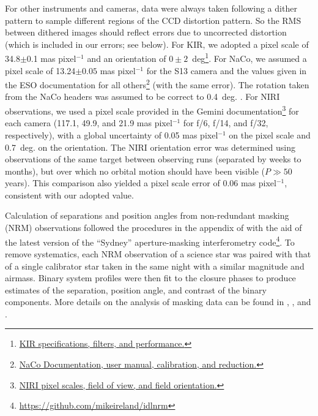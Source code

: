\documentclass[twocolumn]{aastex62}
\begin{document}
For other instruments and cameras, data were always taken following a dither pattern to sample different regions of the CCD distortion pattern. So the RMS between dithered images should reflect errors due to uncorrected distortion (which is included in our errors; see below). For KIR, we adopted a pixel scale of 34.8$\pm$0.1 mas pixel$^{-1}$ \citep{2003ApJ...589..410S} and an orientation of $0\pm2$~deg\footnote{\href{http://www.cfht.hawaii.edu/Instruments/Detectors/IR/KIR/}{KIR specifications, filters, and performance.}}. For NaCo, we assumed a pixel scale of 13.24$\pm0.05$ mas pixel$^{-1}$ for the S13 camera \citep{2003A&A...411..157M,2005A&A...435L..13N} and the values given in the ESO documentation for all others\footnote{\href{http://www.eso.org/sci/facilities/paranal/instruments/naco/doc.html}{NaCo Documentation, user manual, calibration, and reduction.}} (with the same error). The rotation taken from the NaCo headers was assumed to be correct to 0.4~deg. \citep{Sef2008}. For NIRI observations, we used a pixel scale provided in the Gemini documentation\footnote{\href{http://www.gemini.edu/sciops/instruments/niri/imaging/pixel-scales-fov-and-field-orientation}{NIRI pixel scales, field of view, and field orientation.}} for each camera (117.1, 49.9, and 21.9 mas pixel$^{-1}$ for f/6, f/14, and f/32, respectively), with a global uncertainty of 0.05 mas pixel$^{-1}$ on the pixel scale and 0.7~deg. on the orientation. The NIRI orientation error was determined using observations of the same target between observing runs (separated by weeks to months), but over which no orbital motion should have been visible ($P\gg50$ years). This comparison also yielded a pixel scale error of 0.06 mas pixel$^{-1}$, consistent with our adopted value.

Calculation of separations and position angles from non-redundant masking (NRM) observations followed the procedures in the appendix of \citet{Kraus2008} with the aid of the latest version of the ``Sydney'' aperture-masking interferometry code\footnote{\href{https://github.com/mikeireland/idlnrm}{https://github.com/mikeireland/idlnrm}}. To remove systematics, each NRM observation of a science star was paired with that of a single calibrator star taken in the same night with a similar magnitude and airmass. Binary system profiles were then fit to the closure phases to produce estimates of the separation, position angle, and contrast of the binary components. More details on the analysis of masking data can be found in \citet{2006ApJ...650L.131L}, \citet{Kraus2008}, and \citet{2012ApJ...744..120E}.
\end{document}
